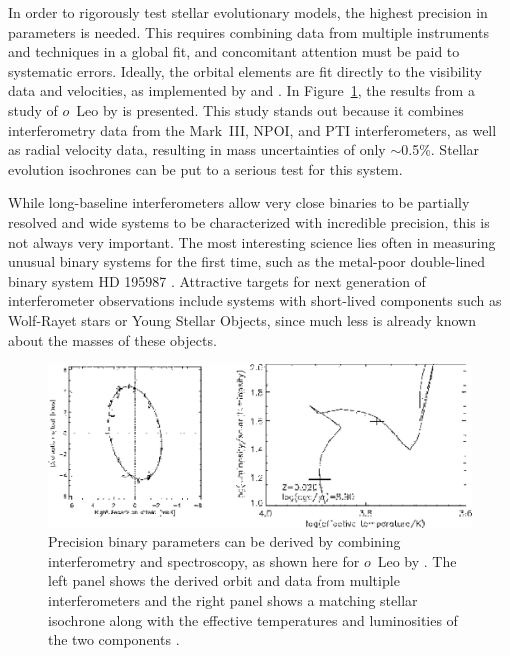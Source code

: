 \documentclass[12pt]{article}
\begin{document}
In order to rigorously test stellar evolutionary models, the highest
precision in parameters is needed. This requires combining data from
multiple instruments and techniques in a global fit, and concomitant
attention must be paid to systematic errors.  Ideally, the orbital elements
are fit directly to the visibility data and velocities, as implemented
by \citet{hummel1998} and \citet{boden1999}.  In
Figure~\ref{omicronleo}, the results from a study of $o$~Leo by
\citet{hummel2001} is presented.  This study stands out because it
combines interferometry data from the Mark~III, NPOI, and PTI
interferometers, as well as radial velocity data, resulting in mass
uncertainties of only $\sim$0.5\%.  Stellar evolution isochrones can
be put to a serious test for this system.


While long-baseline interferometers allow very close binaries to be
partially resolved \citep[closest is probably 0.002'' binary
TZ~Tri;][]{koresko1998} and wide systems to be characterized with
incredible precision, this is not always very important.  The most
interesting science lies often in measuring unusual binary systems for
the first time, such as the metal-poor double-lined binary system HD
195987 \citep{torres2002}.  Attractive targets for next generation of
interferometer observations include systems with short-lived
components such as Wolf-Rayet stars or Young Stellar Objects, since
much less is already known about the masses of these objects.


\begin{figure}[tbhp]
\begin{center}
\includegraphics[clip,angle=0,width=5.0in]{Figures/JDM_hummel2001.eps}
\caption{\footnotesize Precision binary parameters can be
  derived by combining interferometry and spectroscopy, as shown here
  for $o$~Leo by \citet{hummel2001}.  The left panel shows the derived
  orbit and data from multiple interferometers and the right panel
  shows a matching stellar isochrone along with the effective
  temperatures and luminosities of the two components \citep[see
  Figures~10 \&~11 in][reproduced with permission of the
  AAS]{hummel2001}.
\label{omicronleo}}
\end{center}
\end{figure}
\end{document}
